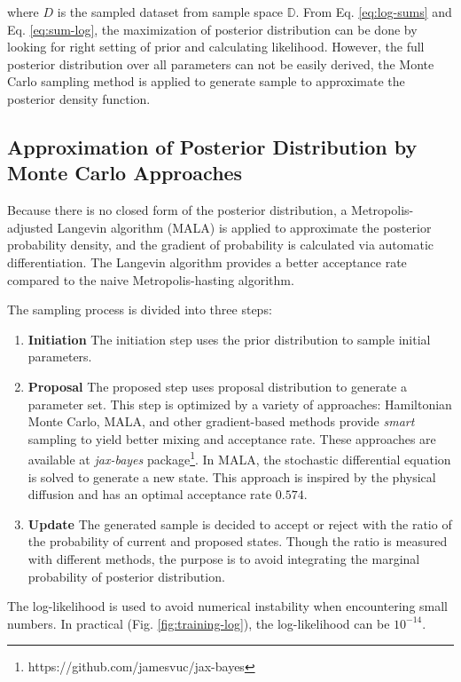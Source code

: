 \documentclass{article}
\begin{document}
where $D$ is the sampled dataset from sample space $\mathbb{D}$. From Eq. \ref{eq:log-sums} and Eq. \ref{eq:sum-log}, the maximization of posterior distribution can be done by looking for right setting of prior and calculating likelihood. However, the full posterior distribution over all parameters can not be easily derived, the Monte Carlo sampling method is applied to generate sample to approximate the posterior density function. 

\subsection{Approximation of Posterior Distribution by Monte Carlo Approaches}

Because there is no closed form of the posterior distribution, a Metropolis-adjusted Langevin algorithm (MALA) is applied to approximate the posterior probability density, and the gradient of probability is calculated via automatic differentiation. The Langevin algorithm provides a better acceptance rate compared to the naive Metropolis-hasting algorithm\cite{roberts1998optimal}. 

The sampling process is divided into three steps:

\begin{enumerate}
    \item \textbf{Initiation} The initiation step uses the prior distribution to sample initial parameters.
    \item \textbf{Proposal} The proposed step uses proposal distribution to generate a  parameter set. This step is optimized by a variety of approaches\cite{jospin2022a}: Hamiltonian Monte Carlo\cite{neal1996, neal2011}, MALA, and other gradient-based methods provide \textit{smart} sampling to yield better mixing and acceptance rate. These approaches are available at \textit{jax-bayes} package\footnote{https://github.com/jamesvuc/jax-bayes}. In MALA, the stochastic differential equation is solved to generate a new state. This approach is inspired by the physical diffusion and has an optimal acceptance rate $0.574$\cite{roberts1998optimal}.
    \item \textbf{Update} The generated sample is decided to accept or reject with the ratio of the probability of current and proposed states. Though the ratio is measured with different methods, the purpose is to avoid integrating the marginal probability of posterior distribution.
\end{enumerate}


The log-likelihood is used to avoid numerical instability when encountering small numbers. In practical (Fig. \ref{fig:training-log}), the log-likelihood can be $10^{-14}$. 
\end{document}
